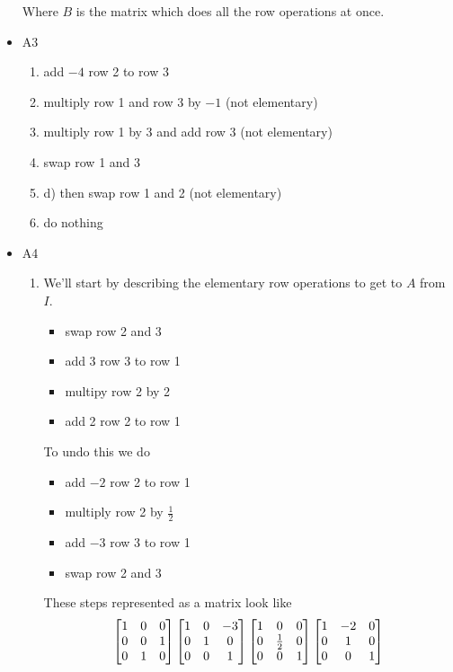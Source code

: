 \documentclass[11pt]{book}
\begin{document}
\begin{itemize}
\[        \]
        Where $B$ is the matrix which does all the row operations at once.
    \item A3
        \begin{enumerate}[label=\alph*)]
            \item add $-4$ row 2 to row 3
            \item multiply row 1 and row 3 by $-1$ (not elementary)
            \item multiply row 1 by 3 and add row 3 (not elementary)
            \item swap row 1 and 3
            \item d) then swap row 1 and 2 (not elementary)
            \item do nothing  
        \end{enumerate}
    \item A4
        \begin{enumerate}[label=\alph*)]
            \item We'll start by describing the elementary row operations to get to $A$ from $I$. 
                \begin{itemize}
                    \item swap row 2 and 3
                    \item add 3 row 3 to row 1
                    \item multipy row 2 by 2
                    \item add 2 row 2 to row 1
                \end{itemize}
            To undo this we do
                \begin{itemize}
                    \item add $-2$ row 2 to row 1
                    \item multiply row 2 by $\frac{1}{2}$ 
                    \item add $ - 3$ row 3 to row 1
                    \item swap row 2 and 3
                \end{itemize}
            These steps represented as a matrix look like
            \[
            \begin{bmatrix} 1 & 0 & 0 \\ 0 & 0 & 1 \\ 0 & 1 & 0 \end{bmatrix}\begin{bmatrix} 1 & 0 & -3 \\ 0 & 1 & 0 \\ 0 & 0 & 1 \end{bmatrix}\begin{bmatrix} 1 & 0 & 0 \\ 0 & \frac{1}{2} & 0 \\ 0 & 0 & 1 \end{bmatrix}\begin{bmatrix} 1 & -2 & 0 \\ 0 & 1 & 0 \\ 0 & 0 & 1 \end{bmatrix}
\]
\end{enumerate}
\end{itemize}
\end{document}
